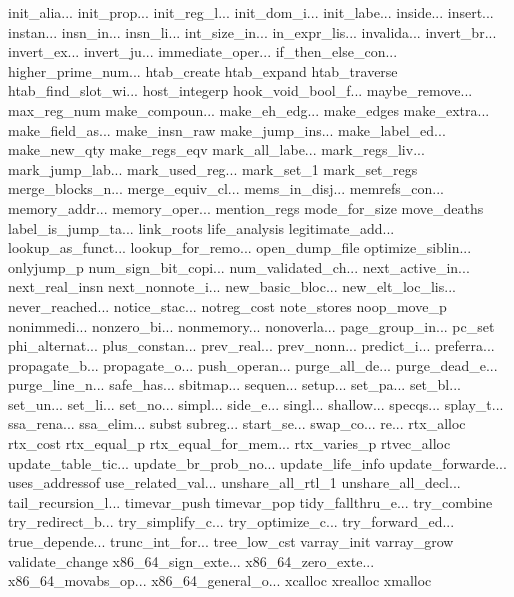 init_alia...
init_prop...
init_reg_l...
init_dom_i...
init_labe...
inside...
insert...
instan...
insn_in...
insn_li...
int_size_in...
in_expr_lis...
invalida...
invert_br...
invert_ex...
invert_ju...
immediate_oper...
if_then_else_con...
higher_prime_num...
htab_create
htab_expand
htab_traverse
htab_find_slot_wi...
host_integerp
hook_void_bool_f...
maybe_remove...
max_reg_num
make_compoun...
make_eh_edg...
make_edges
make_extra...
make_field_as...
make_insn_raw
make_jump_ins...
make_label_ed...
make_new_qty
make_regs_eqv
mark_all_labe...
mark_regs_liv...
mark_jump_lab...
mark_used_reg...
mark_set_1
mark_set_regs
merge_blocks_n...
merge_equiv_cl...
mems_in_disj...
memrefs_con...
memory_addr...
memory_oper...
mention_regs
mode_for_size
move_deaths
label_is_jump_ta...
link_roots
life_analysis
legitimate_add...
lookup_as_funct...
lookup_for_remo...
open_dump_file
optimize_siblin...
onlyjump_p
num_sign_bit_copi...
num_validated_ch...
next_active_in...
next_real_insn
next_nonnote_i...
new_basic_bloc...
new_elt_loc_lis...
never_reached...
notice_stac...
notreg_cost
note_stores
noop_move_p
nonimmedi...
nonzero_bi...
nonmemory...
nonoverla...
page_group_in...
pc_set
phi_alternat...
plus_constan...
prev_real...
prev_nonn...
predict_i...
preferra...
propagate_b...
propagate_o...
push_operan...
purge_all_de...
purge_dead_e...
purge_line_n...
safe_has...
sbitmap...
sequen...
setup...
set_pa...
set_bl...
set_un...
set_li...
set_no...
simpl...
side_e...
singl...
shallow...
specqs...
splay_t...
ssa_rena...
ssa_elim...
subst
subreg...
start_se...
swap_co...
re...
rtx_alloc
rtx_cost
rtx_equal_p
rtx_equal_for_mem...
rtx_varies_p
rtvec_alloc
update_table_tic...
update_br_prob_no...
update_life_info
update_forwarde...
uses_addressof
use_related_val...
unshare_all_rtl_1
unshare_all_decl...
tail_recursion_l...
timevar_push
timevar_pop
tidy_fallthru_e...
try_combine
try_redirect_b...
try_simplify_c...
try_optimize_c...
try_forward_ed...
true_depende...
trunc_int_for...
tree_low_cst
varray_init
varray_grow
validate_change
x86_64_sign_exte...
x86_64_zero_exte...
x86_64_movabs_op...
x86_64_general_o...
xcalloc
xrealloc
xmalloc
